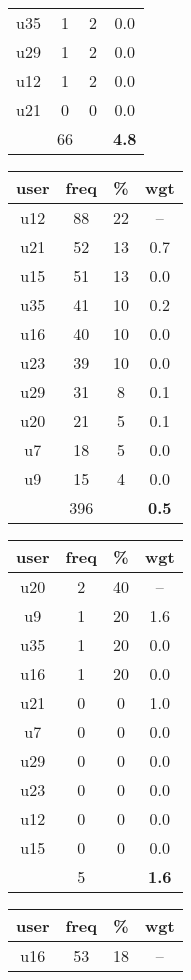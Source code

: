\begin{appendices}
\begin{table}
\begin{tabular}{ |c|c|c|c| }
	u35 & 1 & 2 & 0.0 \\
	u29 & 1 & 2 & 0.0 \\
	u12 & 1 & 2 & 0.0 \\
	u21 & 0 & 0 & 0.0 \\
	 & 66 & & \textbf{4.8} \\
	\hline
\end{tabular}
\begin{tabular}{ |c|c|c|c| }
	\hline
	\textbf{user} & \textbf{freq} & \textbf{\%} & \textbf{wgt} \\
	\hline
	u12 & 88 & 22 & -- \\
	u21 & 52 & 13 & 0.7 \\
	u15 & 51 & 13 & 0.0 \\
	u35 & 41 & 10 & 0.2 \\
	u16 & 40 & 10 & 0.0 \\
	u23 & 39 & 10 & 0.0 \\
	u29 & 31 & 8 & 0.1 \\
	u20 & 21 & 5 & 0.1 \\
	u7 & 18 & 5 & 0.0 \\
	u9 & 15 & 4 & 0.0 \\
	 & 396 & & \textbf{0.5} \\
	\hline
\end{tabular}
\begin{tabular}{ |c|c|c|c| }
	\hline
	\textbf{user} & \textbf{freq} & \textbf{\%} & \textbf{wgt} \\
	\hline
	u20 & 2 & 40 & -- \\
	u9 & 1 & 20 & 1.6 \\
	u35 & 1 & 20 & 0.0 \\
	u16 & 1 & 20 & 0.0 \\
	u21 & 0 & 0 & 1.0 \\
	u7 & 0 & 0 & 0.0 \\
	u29 & 0 & 0 & 0.0 \\
	u23 & 0 & 0 & 0.0 \\
	u12 & 0 & 0 & 0.0 \\
	u15 & 0 & 0 & 0.0 \\
	 & 5 & & \textbf{1.6} \\
	\hline
\end{tabular}
\begin{tabular}{ |c|c|c|c| }
	\hline
	\textbf{user} & \textbf{freq} & \textbf{\%} & \textbf{wgt} \\
	\hline
	u16 & 53 & 18 & -- \\

\end{tabular}
\end{table}
\end{appendices}
